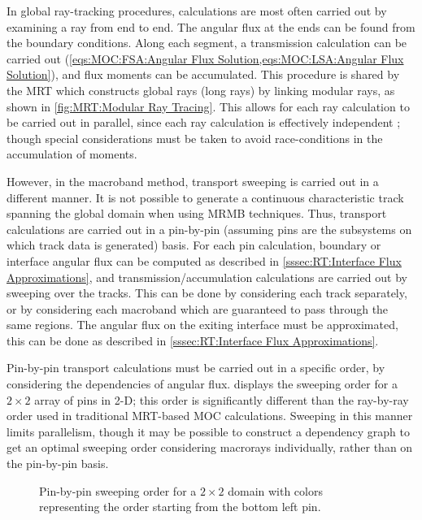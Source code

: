 {{{        In global ray-tracking procedures, calculations are most often carried out by examining a ray from end to end.
        The angular flux at the ends can be found from the boundary conditions.
        Along each segment, a transmission calculation can be carried out (\cref{eqs:MOC:FSA:Angular Flux Solution,eqs:MOC:LSA:Angular Flux Solution}), and flux moments can be accumulated.
        This procedure is shared by the \ac{MRT} which constructs global rays (long rays) by linking modular rays, as shown in \cref{fig:MRT:Modular Ray Tracing}.
        This allows for each ray calculation to be carried out in parallel, since each ray calculation is effectively independent \cite{Kochunas2013}; though special considerations must be taken to avoid race-conditions in the accumulation of moments.

        However, in the macroband method, transport sweeping is carried out in a different manner.
        It is not possible to generate a continuous characteristic track spanning the global domain when using \ac{MRMB} techniques.
        Thus, transport calculations are carried out in a pin-by-pin (assuming pins are the subsystems on which track data is generated) basis.
        For each pin calculation, boundary or interface angular flux can be computed as described in \cref{sssec:RT:Interface Flux Approximations}, and transmission/accumulation calculations are carried out by sweeping over the tracks.
        This can be done by considering each track separately, or by considering each macroband which are guaranteed to pass through the same regions.
        The angular flux on the exiting interface must be approximated, this can be done as described in \cref{sssec:RT:Interface Flux Approximations}.

        Pin-by-pin transport calculations must be carried out in a specific order, by considering the dependencies of angular flux.
         displays the sweeping order for a $2\times2$ array of pins in 2-D; this order is significantly different than the ray-by-ray order used in traditional \ac{MRT}-based \ac{MOC} calculations.
        Sweeping in this manner limits parallelism, though it may be possible to construct a dependency graph to get an optimal sweeping order considering macrorays individually, rather than on the pin-by-pin basis.

        \begin{figure}[h]
          \centering
          \def\svgwidth{0.45\linewidth}
          
          \caption{Pin-by-pin sweeping order for a $2\times2$ domain with colors representing the order starting from the bottom left pin.}
          \label{fig:RT:Macroband Sweep Order}
        \end{figure}
      }
    }

}

